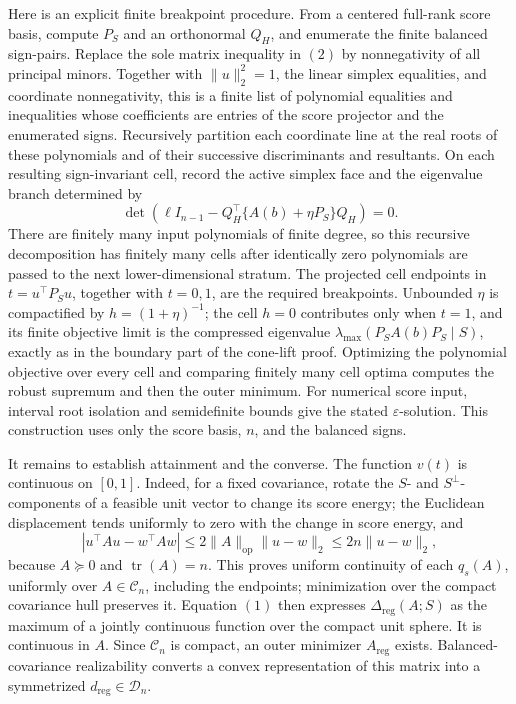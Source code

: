 Here is an explicit finite breakpoint procedure.  From a centered full-rank score basis, compute \(P_S\) and an orthonormal \(Q_H\), and enumerate the finite balanced sign-pairs.  Replace the sole matrix inequality in \((2)\) by nonnegativity of all principal minors.  Together with \(\|u\|_2^2=1\), the linear simplex equalities, and coordinate nonnegativity, this is a finite list of polynomial equalities and inequalities whose coefficients are entries of the score projector and the enumerated signs.  Recursively partition each coordinate line at the real roots of these polynomials and of their successive discriminants and resultants.  On each resulting sign-invariant cell, record the active simplex face and the eigenvalue branch determined by
\[
\det\!\left(\ell I_{n-1}-Q_H^\top\{A(b)+\eta P_S\}Q_H\right)=0.
\]
There are finitely many input polynomials of finite degree, so this recursive decomposition has finitely many cells after identically zero polynomials are passed to the next lower-dimensional stratum.  The projected cell endpoints in \(t=u^\top P_Su\), together with \(t=0,1\), are the required breakpoints.  Unbounded \(\eta\) is compactified by \(h=(1+\eta)^{-1}\); the cell \(h=0\) contributes only when \(t=1\), and its finite objective limit is the compressed eigenvalue \(\lambda_{\max}(P_SA(b)P_S\mid S)\), exactly as in the boundary part of the cone-lift proof.  Optimizing the polynomial objective over every cell and comparing finitely many cell optima computes the robust supremum and then the outer minimum.  For numerical score input, interval root isolation and semidefinite bounds give the stated \(\varepsilon\)-solution.  This construction uses only the score basis, \(n\), and the balanced signs.

It remains to establish attainment and the converse.  The function \(v(t)\) is continuous on \([0,1]\).  Indeed, for a fixed covariance, rotate the \(S\)- and \(S^\perp\)-components of a feasible unit vector to change its score energy; the Euclidean displacement tends uniformly to zero with the change in score energy, and
\[
|u^\top Au-w^\top Aw|\leq2\|A\|_{\mathrm{op}}\|u-w\|_2\leq2n\|u-w\|_2,
\]
because \(A\succeq0\) and \(\operatorname{tr}(A)=n\).  This proves uniform continuity of each \(q_s(A)\), uniformly over \(A\in\mathcal C_n\), including the endpoints; minimization over the compact covariance hull preserves it.  Equation \((1)\) then expresses \(\Delta_{\mathrm{reg}}(A;S)\) as the maximum of a jointly continuous function over the compact unit sphere.  It is continuous in \(A\).  Since \(\mathcal C_n\) is compact, an outer minimizer \(A_{\mathrm{reg}}\) exists.  Balanced-covariance realizability converts a convex representation of this matrix into a symmetrized \(d_{\mathrm{reg}}\in\mathcal D_n\).

